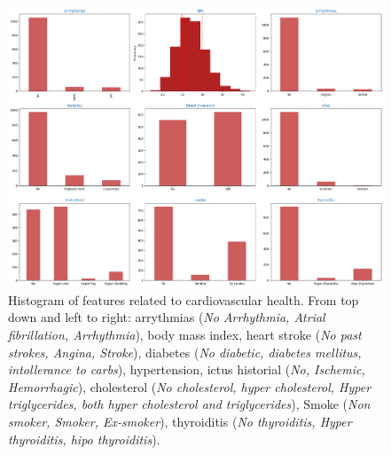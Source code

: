 \documentclass[11pt]{article}
\theoremstyle{definition}
\theoremstyle{remark}
\begin{document}



\begin{figure}[H]
        \centering
        \includegraphics[keepaspectratio, width=\linewidth]{figures/Fig_cardio}
        \caption{Histogram of features related to cardiovascular health. From top down and left to right: arrythmias (\emph{No Arrhythmia, Atrial fibrillation, Arrhythmia}), body mass index, heart stroke (\emph{No past strokes, Angina, Stroke}), diabetes (\emph{No diabetic, diabetes mellitus, intollerance to carbs}), hypertension, ictus historial (\emph{No, Ischemic, Hemorrhagic}), cholesterol (\emph{No cholesterol, hyper cholesterol, Hyper triglycerides, both hyper cholesterol and triglycerides}), Smoke (\emph{Non smoker, Smoker, Ex-smoker}), thyroiditis (\emph{No thyroiditis, Hyper thyroiditis, hipo thyroiditis}). } 
        \label{fig:cardio}
\end{figure}
\end{document}

